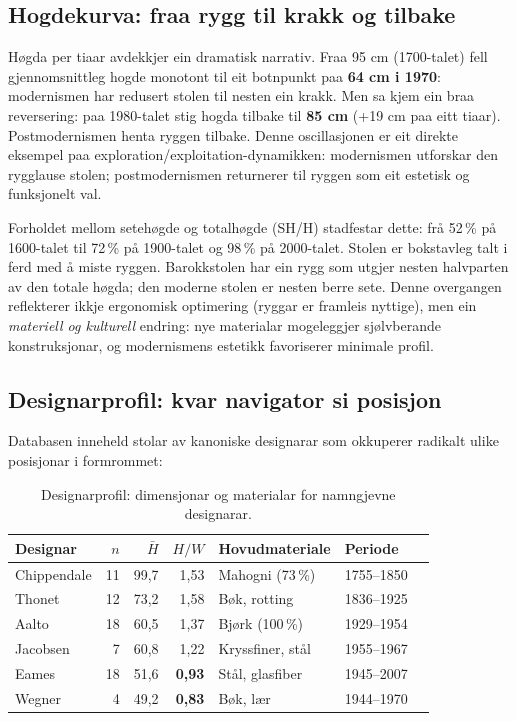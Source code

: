 \documentclass[10pt, a4paper, twocolumn]{article}
\begin{document}
\subsection{Hogdekurva: fraa rygg til krakk og tilbake}

Høgda per tiaar avdekkjer ein dramatisk narrativ. Fraa 95 cm (1700-talet) fell gjennomsnittleg hogde monotont til eit botnpunkt paa \textbf{64 cm i 1970}: modernismen har redusert stolen til nesten ein krakk. Men sa kjem ein braa reversering: paa 1980-talet stig hogda tilbake til \textbf{85 cm} (+19 cm paa eitt tiaar). Postmodernismen henta ryggen tilbake. Denne oscillasjonen er eit direkte eksempel paa exploration/exploitation-dynamikken: modernismen utforskar den rygglause stolen; postmodernismen returnerer til ryggen som eit estetisk og funksjonelt val.

Forholdet mellom setehøgde og totalhøgde (SH/H) stadfestar dette: frå 52\,\% på 1600-talet til 72\,\% på 1900-talet og 98\,\% på 2000-talet. Stolen er bokstavleg talt i ferd med å miste ryggen. Barokkstolen har ein rygg som utgjer nesten halvparten av den totale høgda; den moderne stolen er nesten berre sete. Denne overgangen reflekterer ikkje ergonomisk optimering (ryggar er framleis nyttige), men ein \emph{materiell og kulturell} endring: nye materialar mogeleggjer sjølvberande konstruksjonar, og modernismens estetikk favoriserer minimale profil.

\subsection{Designarprofil: kvar navigator si posisjon}

Databasen inneheld stolar av kanoniske designarar som okkuperer radikalt ulike posisjonar i formrommet:

\begin{table}[H]
\centering
\caption{Designarprofil: dimensjonar og materialar for namngjevne designarar.}
\label{tab:designers}
\begin{tabular}{@{}lrrrlll@{}}
\toprule
\textbf{Designar} & \textbf{$n$} & \textbf{$\bar{H}$} & \textbf{$H/W$} & \textbf{Hovudmateriale} & \textbf{Periode} \\
\midrule
Chippendale & 11 & 99,7 & 1,53 & Mahogni (73\,\%) & 1755--1850 \\
Thonet & 12 & 73,2 & 1,58 & Bøk, rotting & 1836--1925 \\
Aalto & 18 & 60,5 & 1,37 & Bjørk (100\,\%) & 1929--1954 \\
Jacobsen & 7 & 60,8 & 1,22 & Kryssfiner, stål & 1955--1967 \\
Eames & 18 & 51,6 & \textbf{0,93} & Stål, glasfiber & 1945--2007 \\
Wegner & 4 & 49,2 & \textbf{0,83} & Bøk, lær & 1944--1970 \\
\bottomrule
\end{tabular}
\end{table}
\end{document}
